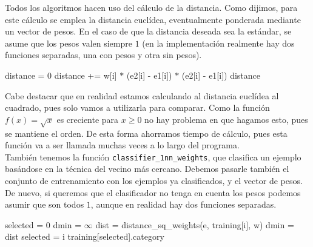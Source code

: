 \documentclass[12pt]{article}
\begin{document}
Todos los algoritmos hacen uso del cálculo de la distancia. Como dijimos, para este cálculo se emplea la distancia euclídea, eventualmente ponderada mediante un vector de pesos. En el caso de que la distancia deseada sea la estándar, se asume que los pesos valen siempre $1$ (en la implementación realmente hay dos funciones separadas, una con pesos y otra sin pesos).

\begin{algorithm}[ht!]
\begin{algorithmic}

     \State distance = $0$
       
            \State distance += w[i] $\ast$ (e2[i] - e1[i]) $\ast$ (e2[i] - e1[i])
         \EndIf
     \EndFor
     \State \Return distance
\EndFunction

\end{algorithmic}
\end{algorithm}

Cabe destacar que en realidad estamos calculando al distancia euclídea al cuadrado, pues solo vamos a utilizarla para comparar. Como la función $f(x)=\sqrt{x}$ es creciente para $x\geq 0$ no hay problema en que hagamos esto, pues se mantiene el orden. De esta forma ahorramos tiempo de cálculo, pues esta función va a ser llamada muchas veces a lo largo del programa.\\

También tenemos la función \verb|classifier_1nn_weights|, que clasifica un ejemplo basándose en la técnica del vecino más cercano. Debemos pasarle también el conjunto de entrenamiento con los ejemplos ya clasificados, y el vector de pesos. De nuevo, si queremos que el clasificador no tenga en cuenta los pesos podemos asumir que son todos $1$, aunque en realidad hay dos funciones separadas.

\begin{algorithm}[h]
\begin{algorithmic}

     \State selected = $0$
     \State dmin = $\infty$
       
            \State dist = distance\_sq\_weights(e, training[i], w)
                \State dmin = dist
                \State selected = i
            \EndIf
         \EndIf
     \EndFor
     \State \Return training[selected].category
\EndFunction

\end{algorithmic}
\end{algorithm}
\end{document}
